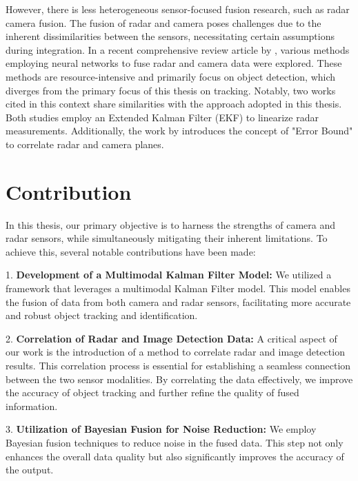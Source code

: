 However, there is less heterogeneous sensor-focused fusion research, such as radar camera fusion.
The fusion of radar and camera poses challenges due to the inherent dissimilarities between the sensors, necessitating certain assumptions during integration.
In a recent comprehensive review article by \citeauthor{Yao_2023}\cite{Yao_2023}, 
various methods employing neural networks to fuse radar and camera data were explored.
These methods are resource-intensive and primarily focus on object detection, 
which diverges from the primary focus of this thesis on tracking. 
Notably, two works cited in this context \cite{8844649}\cite{8932892} share similarities with the approach adopted in this thesis. 
Both studies employ an Extended Kalman Filter (EKF) to linearize radar measurements. 
Additionally, the work by \citeauthor{8844649} introduces the concept of "Error Bound" to correlate radar and camera planes.

\newpage

\section{Contribution}\label{sec:1-contribution}


In this thesis, our primary objective is to harness the strengths of camera and radar sensors, 
while simultaneously mitigating their inherent limitations. To achieve this, several notable contributions have been made:

1. \textbf{Development of a Multimodal Kalman Filter Model: }
We utilized a framework that leverages a multimodal Kalman Filter model. 
This model enables the fusion of data from both camera and radar sensors, 
facilitating more accurate and robust object tracking and identification. 

2. \textbf{Correlation of Radar and Image Detection Data: }
A critical aspect of our work is the introduction of a method to correlate radar and image detection results. 
This correlation process is essential for establishing a seamless connection between the two sensor modalities.
By correlating the data effectively, we improve the accuracy of object tracking and further refine the quality of fused information.

3. \textbf{Utilization of Bayesian Fusion for Noise Reduction: }
We employ Bayesian fusion techniques to reduce noise in the fused data.
This step not only enhances the overall data quality but also significantly improves the accuracy of the output. 

